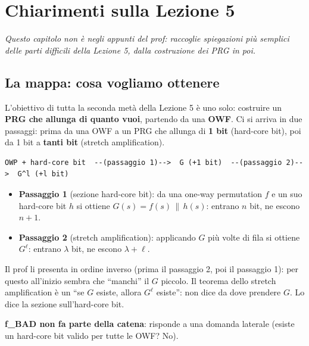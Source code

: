
\chapter{Chiarimenti sulla Lezione 5}

\textit{Questo capitolo non è negli appunti del prof: raccoglie spiegazioni più semplici delle parti difficili della Lezione 5, dalla costruzione dei PRG in poi.}

\section{La mappa: cosa vogliamo ottenere}

\begin{inbreve}
L'obiettivo di tutta la seconda metà della Lezione 5 è uno solo: costruire un \textbf{PRG che allunga di quanto vuoi}, partendo da una \textbf{OWF}. Ci si arriva in due passaggi: prima da una OWF a un PRG che allunga di \textbf{1 bit} (hard-core bit), poi da 1 bit a \textbf{tanti bit} (stretch amplification).
\end{inbreve}

\begin{verbatim}
OWP + hard-core bit  --(passaggio 1)-->  G (+1 bit)  --(passaggio 2)-->  G^l (+l bit)
\end{verbatim}

\begin{itemize}
  \item \textbf{Passaggio 1} (sezione hard-core bit): da una one-way permutation \(f\) e un suo hard-core bit \(h\) si ottiene \(G(s) = f(s) \,\|\, h(s)\): entrano \(n\) bit, ne escono \(n+1\).
  \item \textbf{Passaggio 2} (stretch amplification): applicando \(G\) più volte di fila si ottiene \(G^\ell\): entrano \(\lambda\) bit, ne escono \(\lambda + \ell\).
\end{itemize}

Il prof li presenta in ordine inverso (prima il passaggio 2, poi il passaggio 1): per questo all'inizio sembra che ``manchi'' il \(G\) piccolo. Il teorema dello stretch amplification è un ``se \(G\) esiste, allora \(G^\ell\) esiste'': non dice da dove prendere \(G\). Lo dice la sezione sull'hard-core bit.

\textbf{f\_BAD non fa parte della catena}: risponde a una domanda laterale (esiste un hard-core bit valido per tutte le OWF? No).

